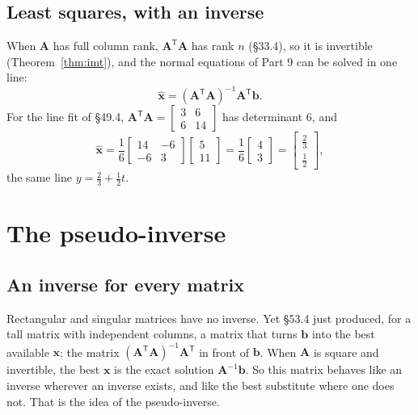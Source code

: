 \documentclass[11pt]{article}
\theoremstyle{plain}
\theoremstyle{definition}
\theoremstyle{remark}
\newcommand{\vc}[1]{\mathbf{#1}}
\newcommand{\mt}[1]{\mathbf{#1}}
\newcommand{\T}{^{\mathsf{T}}}
\newcommand{\xh}{\hat{\vc{x}}}
\begin{document}
\subsection{Least squares, with an inverse}
When $\mt{A}$ has full column rank, $\mt{A}\T\mt{A}$ has rank $n$ (\S33.4), so it
is invertible (Theorem~\ref{thm:imt}), and the normal equations of Part 9 can be
solved in one line:
\[
  \xh=(\mt{A}\T\mt{A})^{-1}\mt{A}\T\vc{b}.
\]
For the line fit of \S49.4, $\mt{A}\T\mt{A}=\begin{bmatrix}3&6\\6&14\end{bmatrix}$ has
determinant $6$, and
\[
  \xh=\frac16\begin{bmatrix}14&-6\\-6&3\end{bmatrix}\begin{bmatrix}5\\11\end{bmatrix}
  =\frac16\begin{bmatrix}4\\3\end{bmatrix}
  =\begin{bmatrix}\frac23\\[2pt]\frac12\end{bmatrix},
\]
the same line $y=\frac23+\frac12t$.

\section{The pseudo-inverse}

\subsection{An inverse for every matrix}
Rectangular and singular matrices have no inverse. Yet \S53.4 just produced, for a
tall matrix with independent columns, a matrix that turns $\vc{b}$ into the best
available $\vc{x}$: the matrix $(\mt{A}\T\mt{A})^{-1}\mt{A}\T$ in front of
$\vc{b}$. When $\mt{A}$ is square and invertible, the best $\vc{x}$ is the exact
solution $\mt{A}^{-1}\vc{b}$. So this matrix behaves like an inverse wherever an
inverse exists, and like the best substitute where one does not. That is the idea
of the pseudo-inverse.
\end{document}

